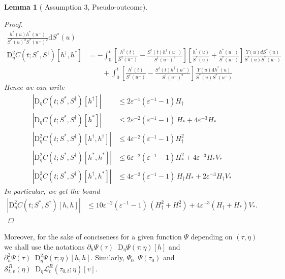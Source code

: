 \documentclass{article}
\newtheorem{lemma}[theorem]{Lemma}
\DeclareMathOperator*{\eqdef }{\,\stackrel{\text{def}}{=}\,}
\newcommand{\nd}{\mathrm{d}}
\newcommand{\bD}{\mathrm{D}}
\begin{document}
\begin{lemma}[\citet{foster2023orthogonal} Assumption 3, Pseudo-outcome]
\begin{proof}
\begin{align*}
  \frac{h^\ast(u)h^\ast(u^-)}{S^\ast(u)^2 S^\ast(u^-)^2} \nd S^\ast(u)\\ 
\bD^2_\eta C(t;S^*, S^\dagger) [h^\dagger, h^*] &= 
- \int_{0}^{t} 
\left[\frac{ h^\dagger(t)}{S^\dagger(u^-)} - \frac{S^\dagger(t) h^\dagger(u^-)}{S^\dagger(u^-)^2} \right]
\left[ \frac{h^\ast(u)}{S^\ast(u)} + \frac{h^\ast(u^-)}{S^\ast(u^-)} \right] \frac{Y(u) dS^*(u)}{S^\ast(u) S^\ast(u^-)} \\
& \qquad + \int_{0}^{t} 
\left[\frac{ h^\dagger(t)}{S^\dagger(u^-)} - \frac{S^\dagger(t) h^\dagger(u^-)}{S^\dagger(u^-)^2} \right]
\frac{Y(u) \nd h^\ast(u)}{S^\ast(u)S^\ast(u^-)}
\end{align*}
Hence we can write
\begin{align*}
|\bD_\eta C(t;S^*, S^\dagger) [h^\dagger]| &\leq 
2 \varepsilon^{-1}(\varepsilon^{-1} - 1) H_\dagger\\
|\bD_\eta C(t;S^*, S^\dagger) [h^\ast]| &\leq 
2 \varepsilon^{-2}(\varepsilon^{-1} - 1)\,H_\ast + 4 \varepsilon^{-3}H_\ast \\
|\bD^2_\eta C(t;S^*, S^\dagger) [h^\dagger, h^\dagger]| &\leq 
4 \varepsilon^{-2}(\varepsilon^{-1} - 1) H_\dagger^2 \\
|\bD^2_\eta C(t;S^*, S^\dagger) [h^\ast, h^\ast]| &\leq 
6 \varepsilon^{-2}(\varepsilon^{-1} - 1) H_\ast^2 + 4 \varepsilon^{-3} H_\ast V_*\\
|\bD^2_\eta C(t;S^*, S^\dagger) [h^\dagger, h^\ast]| &\leq 
4 \varepsilon^{-2}(\varepsilon^{-1} - 1)\,H_\dagger H_\ast+ 2 \varepsilon^{-3} H_\dagger V_* 
\end{align*}
In particular, we get the bound
\begin{align*}
|\bD^2_\eta C(t;S^*, S^\dagger) [h, h]| &\leq 
10 \varepsilon^{-2}(\varepsilon^{-1} - 1)\,(H_\dagger^2 + H_\ast^2)+ 4 \varepsilon^{-3} (H_\dagger + H_\ast) V_*.
\end{align*}
\end{proof}
\end{lemma}

Moreover, for the sake of conciseness for a given function $\Psi$ depending on $(\tau,\eta)$ we 
shall use the notations $\partial_h{\Psi}(\tau) \eqdef \bD_\eta \Psi(\tau;\eta) [h]$ 
and $\partial_h^2{\Psi}(\tau) \eqdef \bD^2_\eta \Psi(\tau;\eta) [h, h]$. 
Similarly, $\Psi_0 \eqdef \Psi(\tau_0)$ and 
$\mathcal{S}_{t,v}^R(\eta) \eqdef \bD_\eta \mathcal{L}^R_t(\tau_{0,t};\eta) [v]$.
\end{document}
